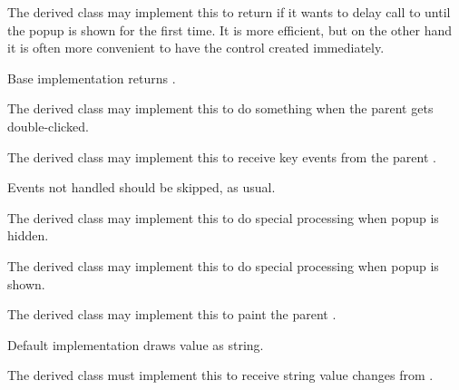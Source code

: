 
The derived class may implement this to return
\true if it wants to delay call to 
until the popup is shown for the first time. It is more
efficient, but on the other hand it is often more convenient
to have the control created immediately.


Base implementation returns \false.


\label{wxcombopopuponcombodoubleclick}


The derived class may implement this to do something
when the parent  gets double-clicked.


\label{wxcombopopuponcombokeyevent}


The derived class may implement this to receive
key events from the parent .

Events not handled should be skipped, as usual.


\label{wxcombopopupondismiss}


The derived class may implement this to do
special processing when popup is hidden.


\label{wxcombopopuponpopup}


The derived class may implement this to do
special processing when popup is shown.


\label{wxcombopopuppaintcombocontrol}


The derived class may implement this to paint
the parent .

Default implementation draws value as string.


\label{wxcombopopupsetstringvalue}


The derived class must implement this to receive
string value changes from .
